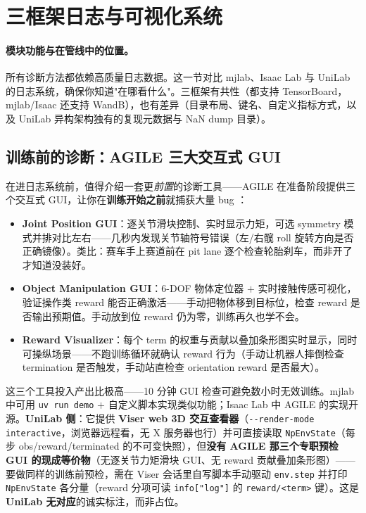 \section{三框架日志与可视化系统}
\label{sec:rlmc-diag-logging}

\paragraph{模块功能与在管线中的位置。}所有诊断方法都依赖高质量日志数据。这一节对比 mjlab、Isaac Lab 与 UniLab 的日志系统，确保你知道"在哪看什么"。三框架有共性（都支持 TensorBoard，mjlab/Isaac 还支持 WandB），也有差异（目录布局、键名、自定义指标方式，以及 UniLab 异构架构独有的复现元数据与 NaN dump 目录）。

\subsection{训练前的诊断：AGILE 三大交互式 GUI}

在进日志系统前，值得介绍一套更\emph{前置}的诊断工具——AGILE 在准备阶段提供三个交互式 GUI，让你在\textbf{训练开始之前}就捕获大量 bug \cite{nvidia2026agile}：

\begin{itemize}
  \item \textbf{Joint Position GUI}：逐关节滑块控制、实时显示力矩，可选 symmetry 模式并排对比左右——几秒内发现关节轴符号错误（左/右髋 roll 旋转方向是否正确镜像）。类比：赛车手上赛道前在 pit lane 逐个检查轮胎刹车，而非开了才知道没装好。
  \item \textbf{Object Manipulation GUI}：6-DOF 物体定位器 $+$ 实时接触传感可视化，验证操作类 reward 能否正确激活——手动把物体移到目标位，检查 reward 是否输出预期值。手动放到位 reward 仍为零，训练再久也学不会。
  \item \textbf{Reward Visualizer}：每个 term 的权重与贡献以叠加条形图实时显示，同时可操纵场景——不跑训练循环就确认 reward 行为（手动让机器人摔倒检查 termination 是否触发，手动站直检查 orientation reward 是否最大）。
\end{itemize}

这三个工具投入产出比极高——10 分钟 GUI 检查可避免数小时无效训练。mjlab 中可用 \verb|uv run demo| $+$ 自定义脚本实现类似功能；Isaac Lab 中 AGILE 的实现开源。\textbf{UniLab 侧}：它提供 \textbf{Viser web 3D 交互查看器}（\verb|--render-mode interactive|，浏览器远程看，无 X 服务器也行）并可直接读取 \verb|NpEnvState|（每步 obs/reward/terminated 的不可变快照），但\textbf{没有 AGILE 那三个专职预检 GUI 的现成等价物}（无逐关节力矩滑块 GUI、无 reward 贡献叠加条形图）——要做同样的训练前预检，需在 Viser 会话里自写脚本手动驱动 \verb|env.step| 并打印 \verb|NpEnvState| 各分量（reward 分项可读 \verb|info["log"]| 的 \verb|reward/<term>| 键）。这是\textbf{UniLab 无对应}的诚实标注，而非占位。

